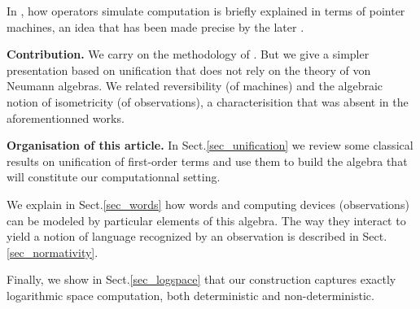 In \cite{girard_normativity_2012}, how operators simulate computation is briefly explained in terms of pointer machines, an idea that has been made precise by the later \cite{aubert_characterizing_2012,seiller_logarithmic_2013}.


\smallskip\noindent
\textbf{Contribution.} We carry on the methodology of \cite{girard_normativity_2012,aubert_characterizing_2012,seiller_logarithmic_2013}.
But we give a simpler presentation based on unification that does not rely on the theory of von Neumann algebras. 
We related reversibility (of machines) and the algebraic notion of isometricity (of observations), a characterisition that was absent in the aforementionned works.

\smallskip\noindent
\textbf{Organisation of this article.} In Sect.\ref{sec_unification} we review some classical results on unification of first-order terms and use them to build the algebra that will constitute our computationnal setting.

We explain in Sect.\ref{sec_words} how words and computing devices (observations) can be modeled by particular elements of this algebra.
The way they interact to yield a notion of language recognized by an observation is described in Sect.\ref{sec_normativity}.

Finally, we show in Sect.\ref{sec_logspace} that our construction captures exactly logarithmic space computation, both deterministic and non-deterministic.
